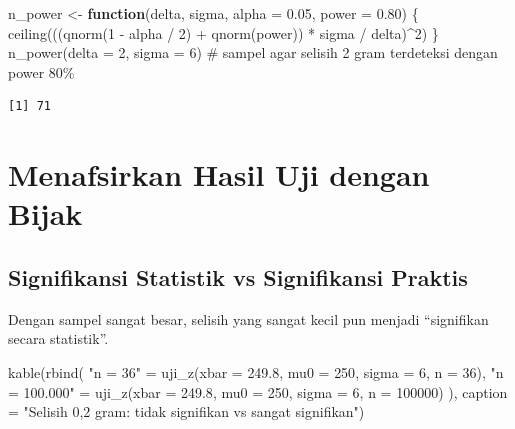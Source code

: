 \documentclass[
  indonesian,
  letterpaper,
]{book}
\newenvironment{Shaded}{\begin{snugshade}}{\end{snugshade}}
\newcommand{\AttributeTok}[1]{\textcolor[rgb]{0.40,0.45,0.13}{#1}}
\newcommand{\CommentTok}[1]{\textcolor[rgb]{0.37,0.37,0.37}{#1}}
\newcommand{\ControlFlowTok}[1]{\textcolor[rgb]{0.00,0.23,0.31}{\textbf{#1}}}
\newcommand{\DecValTok}[1]{\textcolor[rgb]{0.68,0.00,0.00}{#1}}
\newcommand{\FloatTok}[1]{\textcolor[rgb]{0.68,0.00,0.00}{#1}}
\newcommand{\FunctionTok}[1]{\textcolor[rgb]{0.28,0.35,0.67}{#1}}
\newcommand{\NormalTok}[1]{\textcolor[rgb]{0.00,0.23,0.31}{#1}}
\newcommand{\OtherTok}[1]{\textcolor[rgb]{0.00,0.23,0.31}{#1}}
\newcommand{\SpecialCharTok}[1]{\textcolor[rgb]{0.37,0.37,0.37}{#1}}
\newcommand{\StringTok}[1]{\textcolor[rgb]{0.13,0.47,0.30}{#1}}
\begin{document}
\begin{Shaded}
\begin{Highlighting}[]
\NormalTok{n\_power }\OtherTok{\textless{}{-}} \ControlFlowTok{function}\NormalTok{(delta, sigma, }\AttributeTok{alpha =} \FloatTok{0.05}\NormalTok{, }\AttributeTok{power =} \FloatTok{0.80}\NormalTok{) \{}
  \FunctionTok{ceiling}\NormalTok{(((}\FunctionTok{qnorm}\NormalTok{(}\DecValTok{1} \SpecialCharTok{{-}}\NormalTok{ alpha }\SpecialCharTok{/} \DecValTok{2}\NormalTok{) }\SpecialCharTok{+} \FunctionTok{qnorm}\NormalTok{(power)) }\SpecialCharTok{*}\NormalTok{ sigma }\SpecialCharTok{/}\NormalTok{ delta)}\SpecialCharTok{\^{}}\DecValTok{2}\NormalTok{)}
\NormalTok{\}}
\FunctionTok{n\_power}\NormalTok{(}\AttributeTok{delta =} \DecValTok{2}\NormalTok{, }\AttributeTok{sigma =} \DecValTok{6}\NormalTok{)   }\CommentTok{\# sampel agar selisih 2 gram terdeteksi dengan power 80\%}
\end{Highlighting}
\end{Shaded}

\begin{verbatim}
[1] 71
\end{verbatim}


\chapter{Menafsirkan Hasil Uji dengan
Bijak}\label{menafsirkan-hasil-uji-dengan-bijak}

\section{Signifikansi Statistik vs Signifikansi
Praktis}\label{signifikansi-statistik-vs-signifikansi-praktis}

Dengan sampel sangat besar, selisih yang sangat kecil pun menjadi
``signifikan secara statistik''.

\begin{Shaded}
\begin{Highlighting}[]
\FunctionTok{kable}\NormalTok{(}\FunctionTok{rbind}\NormalTok{(}
  \StringTok{"n = 36"}      \OtherTok{=} \FunctionTok{uji\_z}\NormalTok{(}\AttributeTok{xbar =} \FloatTok{249.8}\NormalTok{, }\AttributeTok{mu0 =} \DecValTok{250}\NormalTok{, }\AttributeTok{sigma =} \DecValTok{6}\NormalTok{, }\AttributeTok{n =} \DecValTok{36}\NormalTok{),}
  \StringTok{"n = 100.000"} \OtherTok{=} \FunctionTok{uji\_z}\NormalTok{(}\AttributeTok{xbar =} \FloatTok{249.8}\NormalTok{, }\AttributeTok{mu0 =} \DecValTok{250}\NormalTok{, }\AttributeTok{sigma =} \DecValTok{6}\NormalTok{, }\AttributeTok{n =} \DecValTok{100000}\NormalTok{)}
\NormalTok{), }\AttributeTok{caption =} \StringTok{"Selisih 0,2 gram: tidak signifikan vs sangat signifikan"}\NormalTok{)}
\end{Highlighting}
\end{Shaded}
\end{document}
